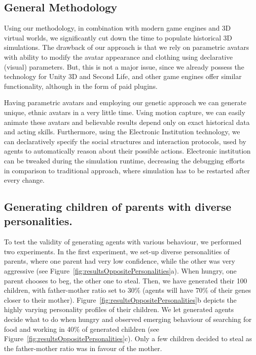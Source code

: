 \documentclass[graybox]{svmult}
\begin{document}
\subsection{General Methodology}

Using our methodology, in combination with modern game engines and 3D virtual worlds, we significantly cut down the time to populate historical 3D simulations. The drawback of our approach is that we rely on parametric avatars with ability to modify the avatar appearance and clothing using declarative (visual) parameters. But, this is not a major issue, since we already possess the technology for Unity 3D and Second Life, and other game engines offer similar functionality, although in the form of paid plugins. 

Having parametric avatars and employing our genetic approach we can generate unique, ethnic avatars in a very little time. Using motion capture, we can easily animate these avatars and believable results depend only on exact historical data and acting skills. Furthermore, using the Electronic Institution technology, we can declaratively specify the social structures and interaction protocols, used by agents to automatically reason about their possible actions. Electronic institution can be tweaked during the simulation runtime, decreasing the debugging efforts in comparison to traditional approach, where simulation has to be restarted after every change.


\subsection{Generating children of parents with diverse personalities.} 

To test the validity of generating agents with various behaviour, we performed two experiments. In the first experiment, we set-up diverse personalities of parents, where one parent had very low confidence, while the other was very aggressive (see Figure~\ref{fig:resultsOppositePersonalities}a). When hungry, one parent chooses to beg, the other one to steal. Then, we have generated their 100 children, with father-mother ratio set to 30\% (agents will have 70\% of their genes closer to their mother). Figure~\ref{fig:resultsOppositePersonalities}b depicts the highly varying personality profiles of their children. We let generated agents decide what to do when hungry and observed emerging behaviour of searching for food and working in 40\% of generated children (see Figure~\ref{fig:resultsOppositePersonalities}c). Only a few children decided to steal as the father-mother ratio was in favour of the mother.  
\end{document}
